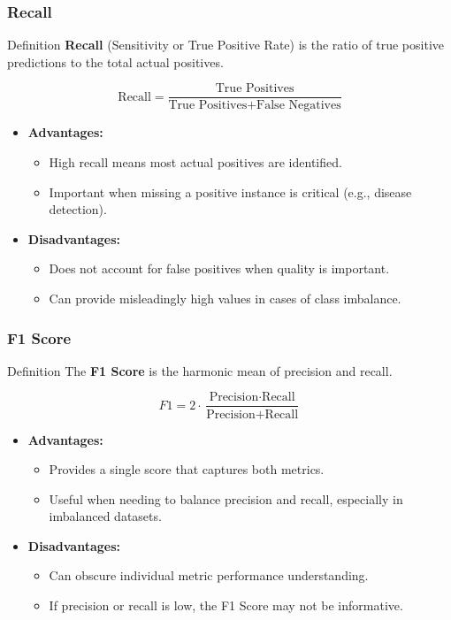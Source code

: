 \documentclass[aspectratio=169]{beamer}
\begin{document}
\begin{frame}[fragile]
    \frametitle{Recall}
    \begin{block}{Definition}
        \textbf{Recall} (Sensitivity or True Positive Rate) is the ratio of true positive predictions to the total actual positives.
    \end{block}
    \begin{equation}
        \text{Recall} = \frac{\text{True Positives}}{\text{True Positives} + \text{False Negatives}} 
    \end{equation}
    \begin{itemize}
        \item \textbf{Advantages:}
            \begin{itemize}
                \item High recall means most actual positives are identified.
                \item Important when missing a positive instance is critical (e.g., disease detection).
            \end{itemize}
        \item \textbf{Disadvantages:}
            \begin{itemize}
                \item Does not account for false positives when quality is important.
                \item Can provide misleadingly high values in cases of class imbalance.
            \end{itemize}
    \end{itemize}
\end{frame}

\begin{frame}[fragile]
    \frametitle{F1 Score}
    \begin{block}{Definition}
        The \textbf{F1 Score} is the harmonic mean of precision and recall.
    \end{block}
    \begin{equation}
        F1 = 2 \cdot \frac{\text{Precision} \cdot \text{Recall}}{\text{Precision} + \text{Recall}} 
    \end{equation}
    \begin{itemize}
        \item \textbf{Advantages:}
            \begin{itemize}
                \item Provides a single score that captures both metrics.
                \item Useful when needing to balance precision and recall, especially in imbalanced datasets.
            \end{itemize}
        \item \textbf{Disadvantages:}
            \begin{itemize}
                \item Can obscure individual metric performance understanding.
                \item If precision or recall is low, the F1 Score may not be informative.
            \end{itemize}
    \end{itemize}
\end{frame}
\end{document}
